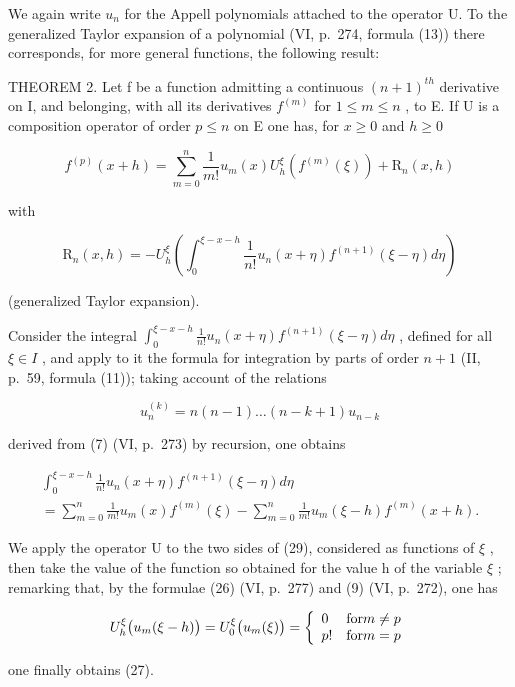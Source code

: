 We again write \(u_{n}\) for the Appell polynomials attached to the operator U. To the generalized Taylor expansion of a polynomial (VI, p.~274, formula (13)) there corresponds, for more general functions, the following result:

THEOREM 2. Let f be a function admitting a continuous \((n+1)^{th}\) derivative on I, and belonging, with all its derivatives \(f^{(m)}\) for \(1 \leqslant m \leqslant n\) , to E. If U is a composition operator of order \(p \leqslant n\) on E one has, for \(x \geqslant 0\) and \(h \geqslant 0\)

\[
f ^ {(p)} (x + h) = \sum_ {m = 0} ^ {n} \frac {1}{m !} u _ {m} (x) U _ {h} ^ {\xi} \left(f ^ {(m)} (\xi)\right) + \mathrm{R} _ {n} (x, h)\tag{27}
\]

with

\[
\mathrm{R} _ {n} (x, h) = - U _ {h} ^ {\xi} \left(\int_ {0} ^ {\xi - x - h} \frac {1}{n !} u _ {n} (x + \eta) f ^ {(n + 1)} (\xi - \eta) d \eta\right)\tag{28}
\]

(generalized Taylor expansion).

Consider the integral \(\int_{0}^{\xi-x-h}\frac{1}{n!}u_{n}(x+\eta)f^{(n+1)}(\xi-\eta)d\eta\) , defined for all \(\xi\in I\) , and apply to it the formula for integration by parts of order \(n+1\) (II, p.~59, formula (11)); taking account of the relations

\[
u _ {n} ^ {(k)} = n (n - 1) \dots (n - k + 1) u _ {n - k}
\]

derived from (7) (VI, p.~273) by recursion, one obtains

\[
\begin{array}{l} \int_ {0} ^ {\xi - x - h} \frac {1}{n !} u _ {n} (x + \eta) f ^ {(n + 1)} (\xi - \eta) d \eta \\ = \sum_ {m = 0} ^ {n} \frac {1}{m !} u _ {m} (x) f ^ {(m)} (\xi) - \sum_ {m = 0} ^ {n} \frac {1}{m !} u _ {m} (\xi - h) f ^ {(m)} (x + h). \end{array}\tag{29}
\]

We apply the operator U to the two sides of (29), considered as functions of \(\xi\) , then take the value of the function so obtained for the value h of the variable \(\xi\) ; remarking that, by the formulae (26) (VI, p.~277) and (9) (VI, p.~272), one has

\[
U _ {h} ^ {\xi} \big (u _ {m} (\xi - h) \big) = U _ {0} ^ {\xi} \big (u _ {m} (\xi) \big) = \left\{ \begin{array}{l l} 0 & \text {for} m \neq p \\ p! & \text {for} m = p \end{array} \right.
\]

one finally obtains (27).

